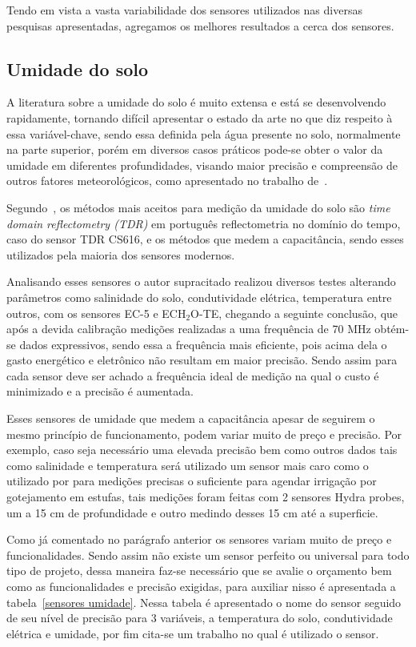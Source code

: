 \documentclass[
article,			%
12pt,				%
oneside,			%
a4paper,			%
english,			%
brazil,				%
sumario=tradicional
]{abntex2}
\begin{document}
Tendo em vista a vasta variabilidade dos sensores utilizados nas diversas pesquisas apresentadas, agregamos os melhores resultados a cerca dos sensores.

\subsection{Umidade do solo}\label{Umidade do solo}

A literatura sobre a umidade do solo é muito extensa e está se desenvolvendo rapidamente, tornando difícil apresentar o estado da arte\cite{11} no que diz respeito à essa variável-chave, sendo essa definida pela água presente no solo\cite{11}, normalmente na parte superior, porém em diversos casos práticos pode-se obter o valor da umidade em diferentes profundidades, visando maior precisão e compreensão de outros fatores meteorológicos, como apresentado no trabalho de~\citeauthor{12}.

Segundo~\citeauthor{3}, os métodos mais aceitos para medição da umidade do solo são \textit{time domain reflectometry (TDR)} em português reflectometria no domínio do tempo, caso do sensor TDR CS616\cite{12}, e os métodos que medem a capacitância, sendo esses utilizados pela maioria dos sensores modernos.

Analisando esses sensores o autor supracitado\cite{3} realizou diversos testes alterando parâmetros como salinidade do solo, condutividade elétrica, temperatura entre outros, com os sensores EC-5 e ECH$_2$O-TE, chegando a seguinte conclusão, que após a devida calibração medições realizadas a uma frequência de 70 MHz obtém-se dados expressivos, sendo essa a frequência mais eficiente, pois acima dela o gasto energético  e eletrônico não resultam em maior precisão. Sendo assim para cada sensor deve ser achado a frequência ideal de medição na qual o custo é minimizado e a precisão é aumentada.

Esses sensores de umidade que medem a capacitância apesar de seguirem o mesmo princípio de funcionamento, podem variar muito de preço e precisão. Por exemplo, caso seja necessário uma elevada precisão bem como outros dados tais como salinidade e temperatura será utilizado um sensor mais caro como o utilizado por \citeauthor{12} para medições precisas o suficiente para agendar irrigação por gotejamento em estufas, tais medições foram feitas com 2 sensores Hydra probes, um a 15 cm de profundidade e outro medindo desses 15 cm até a superficie.

Como já comentado no parágrafo anterior os sensores variam muito de preço e funcionalidades. Sendo assim não existe um sensor perfeito ou universal para todo tipo de projeto, dessa maneira faz-se necessário que se avalie o orçamento bem como as funcionalidades e precisão exigidas, para auxiliar nisso é apresentada a tabela~\ref{sensores umidade}. Nessa tabela é apresentado o nome do sensor seguido de seu nível de precisão para 3 variáveis, a temperatura do solo, condutividade elétrica e umidade, por fim cita-se um trabalho no qual é utilizado o sensor.
\end{document}
